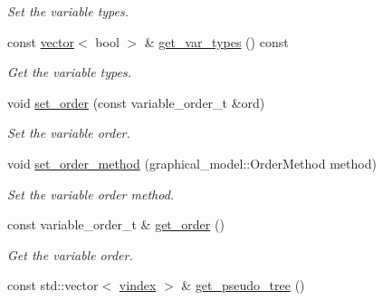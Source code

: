 \begin{DoxyCompactItemize}
\begin{DoxyCompactList}\small\item\em Set the variable types. \end{DoxyCompactList}\item 
\hypertarget{classmerlin_1_1wmb_a6bd57e3e3351407403d7cdf619ea286b}{}const \hyperlink{classmerlin_1_1vector}{vector}$<$ bool $>$ \& \hyperlink{classmerlin_1_1wmb_a6bd57e3e3351407403d7cdf619ea286b}{get\+\_\+var\+\_\+types} () const \label{classmerlin_1_1wmb_a6bd57e3e3351407403d7cdf619ea286b}

\begin{DoxyCompactList}\small\item\em Get the variable types. \end{DoxyCompactList}\item 
\hypertarget{classmerlin_1_1wmb_aa16d549dcec0debda59998b3a8960212}{}void \hyperlink{classmerlin_1_1wmb_aa16d549dcec0debda59998b3a8960212}{set\+\_\+order} (const variable\+\_\+order\+\_\+t \&ord)\label{classmerlin_1_1wmb_aa16d549dcec0debda59998b3a8960212}

\begin{DoxyCompactList}\small\item\em Set the variable order. \end{DoxyCompactList}\item 
\hypertarget{classmerlin_1_1wmb_a4d6c6775868cac1a8559be5575d301f5}{}void \hyperlink{classmerlin_1_1wmb_a4d6c6775868cac1a8559be5575d301f5}{set\+\_\+order\+\_\+method} (graphical\+\_\+model\+::\+Order\+Method method)\label{classmerlin_1_1wmb_a4d6c6775868cac1a8559be5575d301f5}

\begin{DoxyCompactList}\small\item\em Set the variable order method. \end{DoxyCompactList}\item 
\hypertarget{classmerlin_1_1wmb_a2709605ec51725e4164d488bb71c81a7}{}const variable\+\_\+order\+\_\+t \& \hyperlink{classmerlin_1_1wmb_a2709605ec51725e4164d488bb71c81a7}{get\+\_\+order} ()\label{classmerlin_1_1wmb_a2709605ec51725e4164d488bb71c81a7}

\begin{DoxyCompactList}\small\item\em Get the variable order. \end{DoxyCompactList}\item 
\hypertarget{classmerlin_1_1wmb_a23118e3df645be1029fa7642bf8fe090}{}const std\+::vector$<$ \hyperlink{classmerlin_1_1wmb_ab942720d1c65e0002674af4eeade660f}{vindex} $>$ \& \hyperlink{classmerlin_1_1wmb_a23118e3df645be1029fa7642bf8fe090}{get\+\_\+pseudo\+\_\+tree} ()\label{classmerlin_1_1wmb_a23118e3df645be1029fa7642bf8fe090}


\end{DoxyCompactItemize}
